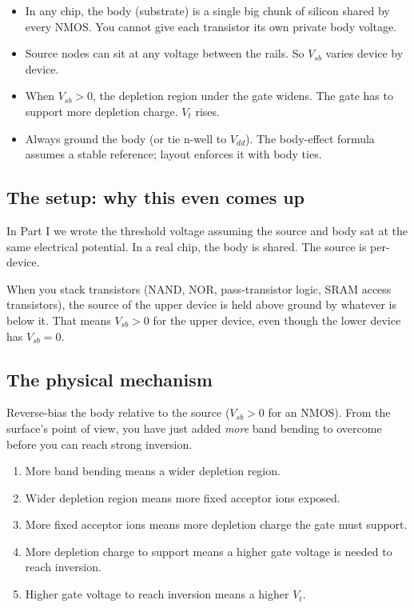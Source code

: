 \documentclass[11pt]{article}
\begin{document}
\begin{tldr}
\begin{itemize}[leftmargin=*]
\item In any chip, the body (substrate) is a single big chunk of silicon shared by every NMOS. You cannot give each transistor its own private body voltage.
\item Source nodes can sit at any voltage between the rails. So $V_{sb}$ varies device by device.
\item When $V_{sb} > 0$, the depletion region under the gate widens. The gate has to support more depletion charge. $V_t$ rises.
\item Always ground the body (or tie n-well to $V_{dd}$). The body-effect formula assumes a stable reference; layout enforces it with body ties.
\end{itemize}
\end{tldr}

\subsection{The setup: why this even comes up}

In Part I we wrote the threshold voltage assuming the source and body sat at the same electrical potential. In a real chip, the body is shared. The source is per-device.

When you stack transistors (NAND, NOR, pass-transistor logic, SRAM access transistors), the source of the upper device is held above ground by whatever is below it. That means $V_{sb} > 0$ for the upper device, even though the lower device has $V_{sb} = 0$.

\subsection{The physical mechanism}

Reverse-bias the body relative to the source ($V_{sb} > 0$ for an NMOS). From the surface's point of view, you have just added \emph{more} band bending to overcome before you can reach strong inversion.

\begin{enumerate}
\item More band bending means a wider depletion region.
\item Wider depletion region means more fixed acceptor ions exposed.
\item More fixed acceptor ions means more depletion charge the gate must support.
\item More depletion charge to support means a higher gate voltage is needed to reach inversion.
\item Higher gate voltage to reach inversion means a higher $V_t$.
\end{enumerate}
\end{document}

